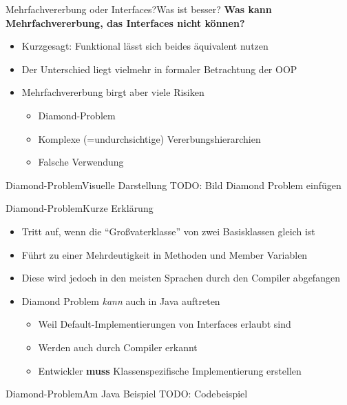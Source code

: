 \begin{frame}{Mehrfachvererbung oder Interfaces?}{Was ist besser?}
\textbf{Was kann Mehrfachvererbung, das Interfaces nicht können?}
    \begin{itemize}[<+->]
        \item Kurzgesagt: Funktional lässt sich beides äquivalent nutzen
        \item Der Unterschied liegt vielmehr in formaler Betrachtung der OOP
        \item Mehrfachvererbung birgt aber viele Risiken
        \begin{itemize}
            \item Diamond-Problem
            \item Komplexe (=undurchsichtige) Vererbungshierarchien
            \item Falsche Verwendung
        \end{itemize}
    \end{itemize}
\end{frame}

\begin{frame}{Diamond-Problem}{Visuelle Darstellung}
TODO: Bild Diamond Problem einfügen
\end{frame}

\begin{frame}{Diamond-Problem}{Kurze Erklärung}
    \begin{itemize}
        \item Tritt auf, wenn die "`Großvaterklasse"' von zwei Basisklassen gleich ist
        \item Führt zu einer Mehrdeutigkeit in Methoden und Member Variablen
        \item Diese wird jedoch in den meisten Sprachen durch den Compiler abgefangen
        \item Diamond Problem \textit{kann} auch in Java auftreten
        \begin{itemize}
            \item Weil Default-Implementierungen von Interfaces erlaubt sind
            \item Werden auch durch Compiler erkannt
            \item Entwickler \textbf{muss} Klassenspezifische Implementierung erstellen
        \end{itemize}
    \end{itemize}
\end{frame}

\begin{frame}{Diamond-Problem}{Am Java Beispiel}
TODO: Codebeispiel
\end{frame}

